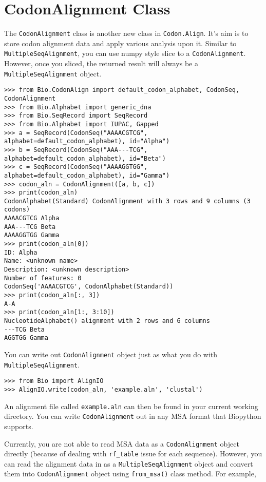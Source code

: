 \section{CodonAlignment Class}

The \verb|CodonAlignment| class is another new class in
\verb|Codon.Align|. It's aim is to store codon alignment data and
apply various analysis upon it. Similar to
\verb|MultipleSeqAlignment|, you can use numpy style slice to a
\verb|CodonAlignment|. However, once you sliced, the returned result
will always be a \verb|MultipleSeqAlignment| object.

\begin{verbatim}
>>> from Bio.CodonAlign import default_codon_alphabet, CodonSeq, CodonAlignment
>>> from Bio.Alphabet import generic_dna
>>> from Bio.SeqRecord import SeqRecord
>>> from Bio.Alphabet import IUPAC, Gapped
>>> a = SeqRecord(CodonSeq("AAAACGTCG", alphabet=default_codon_alphabet), id="Alpha")
>>> b = SeqRecord(CodonSeq("AAA---TCG", alphabet=default_codon_alphabet), id="Beta")
>>> c = SeqRecord(CodonSeq("AAAAGGTGG", alphabet=default_codon_alphabet), id="Gamma")
>>> codon_aln = CodonAlignment([a, b, c])
>>> print(codon_aln)
CodonAlphabet(Standard) CodonAlignment with 3 rows and 9 columns (3 codons)
AAAACGTCG Alpha
AAA---TCG Beta
AAAAGGTGG Gamma
>>> print(codon_aln[0])
ID: Alpha
Name: <unknown name>
Description: <unknown description>
Number of features: 0
CodonSeq('AAAACGTCG', CodonAlphabet(Standard))
>>> print(codon_aln[:, 3])
A-A
>>> print(codon_aln[1:, 3:10])
NucleotideAlphabet() alignment with 2 rows and 6 columns
---TCG Beta
AGGTGG Gamma
\end{verbatim}

You can write out \verb|CodonAlignment| object just as what you do
with \verb|MultipleSeqAlignment|.

\begin{verbatim}
>>> from Bio import AlignIO
>>> AlignIO.write(codon_aln, 'example.aln', 'clustal')
\end{verbatim}

An alignment file called \texttt{example.aln} can then be found in your
current working directory. You can write \verb|CodonAlignment| out in
any MSA format that Biopython supports.

Currently, you are not able to read MSA data as a
\verb|CodonAlignment| object directly (because of dealing with
\texttt{rf\_table} issue for each sequence). However, you can read the
alignment data in as a \verb|MultipleSeqAlignment| object and convert
them into \verb|CodonAlignment| object using \verb|from_msa()|
class method. For example,

